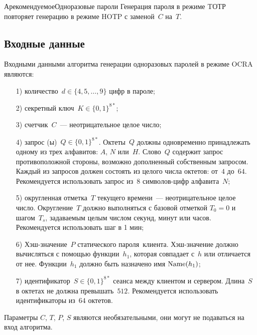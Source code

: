 \begin{appendix}{А}{рекомендуемое}{Одноразовые пароли}
Генерация пароля в режиме TОТР повторяет генерацию в режиме HOTP
с заменой~$C$ на~$T$.

\label{OTP.OCRA}

\subsection{Входные данные}

Входными данными алгоритма генерации одноразовых паролей
в режиме OCRA являются:
\begin{itemize}
\item[1)]
количество~$d\in\{4,5,\ldots,9\}$ цифр в пароле;

\item[2)]
секретный ключ~$K\in\{0,1\}^{8*}$;

\item[3)]
счетчик~$C$~--- неотрицательное целое число;

\item[4)]
запрос (ы)~$Q\in\{0,1\}^{8*}$.
Октеты~$Q$ должны одновременно принадлежать одному из трех алфавитов:
$A$, $N$ или~$H$. 
%
Слово~$Q$ содержит запрос противоположной стороны,
возможно дополненный собственным запросом.
%
Каждый из запросов должен состоять из целого числа 
октетов: от~$4$ до~$64$. Рекомендуется использовать 
запрос из~$8$ символов-цифр алфавита~$N$;

\item[5)]
округленная отметка~$T$ текущего времени~--- неотрицательное целое число. 
Округление~$T$ должно выполняться с базовой отметкой $T_0=0$ 
и шагом~$T_s$, задаваемым целым числом секунд, минут или часов.
Рекомендуется использовать шаг в 1 мин;

\item[6)]
Хэш-значение~$P$ статического пароля~клиента.
Хэш-значение должно вычисляться с помощью функции~$h_1$,
которая совпадает с~$h$ или отличается от нее.
Функции~$h_1$ должно быть назначено имя $\text{Name}(h_1)$;

\item[7)]
идентификатор~$S\in\{0,1\}^{8*}$ сеанса между клиентом и сервером.
Длина~$S$ в октетах не должна превышать~$512$.
Рекомендуется использовать идентификаторы из~$64$ октетов.
\end{itemize}

Параметры $C$, $T$, $P$, $S$ являются необязательными, 
они могут не подаваться на вход алгоритма.


\end{appendix}
